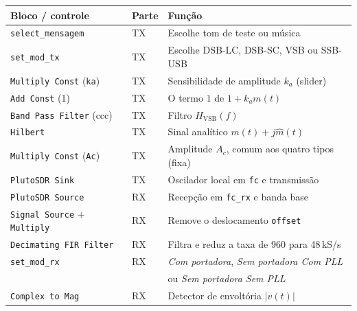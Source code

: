 \documentclass[11pt,a4paper]{article}
\begin{document}
\begin{table}[H]
      \centering
      \begin{tabular}{l l l}
            \toprule
            \textbf{Bloco / controle}                  & \textbf{Parte} & \textbf{Função}                                    \\
            \midrule
            \texttt{select\_mensagem}                  & TX             & Escolhe tom de teste ou música                     \\
            \texttt{set\_mod\_tx}                      & TX             & Escolhe DSB-LC, DSB-SC, VSB ou SSB-USB             \\
            \texttt{Multiply Const} (\texttt{ka})      & TX             & Sensibilidade de amplitude $k_a$ (slider)          \\
            \texttt{Add Const} (1)                     & TX             & O termo $1$ de $1 + k_a m(t)$                      \\
            \texttt{Band Pass Filter} (ccc)            & TX             & Filtro $H_\text{VSB}(f)$                           \\
            \texttt{Hilbert}                           & TX             & Sinal analítico $m(t) + j\hat{m}(t)$               \\
            \texttt{Multiply Const} (\texttt{Ac})      & TX             & Amplitude $A_c$, comum aos quatro tipos (fixa)     \\
            \texttt{PlutoSDR Sink}                     & TX             & Oscilador local em \texttt{fc} e transmissão       \\
            \texttt{PlutoSDR Source}                   & RX             & Recepção em \texttt{fc\_rx} e banda base           \\
            \texttt{Signal Source} + \texttt{Multiply} & RX             & Remove o deslocamento \texttt{offset}              \\
            \texttt{Decimating FIR Filter}             & RX             & Filtra e reduz a taxa de 960 para 48\,kS/s         \\
            \texttt{set\_mod\_rx}                      & RX             & \emph{Com portadora}, \emph{Sem portadora Com PLL} \\
                                                       &                & ou \emph{Sem portadora Sem PLL}                    \\
            \texttt{Complex to Mag}                    & RX             & Detector de envoltória $|v(t)|$                    \\

\end{tabular}
\end{table}
\end{document}
